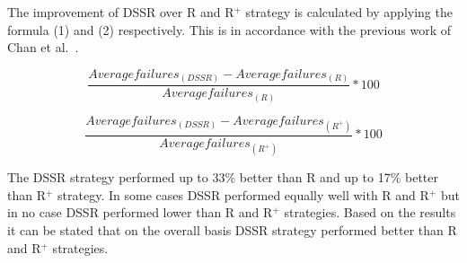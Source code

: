 The improvement of DSSR over R and R$^+$ strategy is calculated by applying the formula (1) and (2) respectively. This is in accordance with the previous work of Chan et al.~\cite{chan2004good}.

\begin{equation} \frac{Averagefailures_{(DSSR)} - Averagefailures_{(R)}}{Averagefailures_{(R)}} * 100  \end{equation}

\begin{equation} \frac{Averagefailures_{(DSSR)} - Averagefailures_{(R^+)}}{Averagefailures_{(R^+)}}  * 100 \end{equation}

The DSSR strategy performed up to 33\% better than R and up to 17\% better than R$^+$ strategy. In some cases DSSR performed equally well with R and R$^+$ but in no case DSSR performed lower than R and R$^+$ strategies. Based on the results it can be stated that on the overall basis DSSR strategy performed better than R and R$^+$ strategies. 

